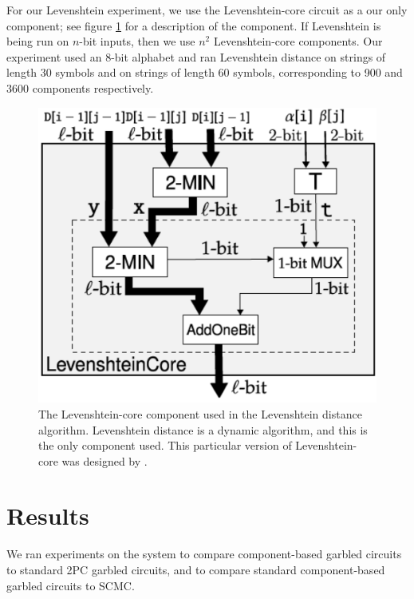For our Levenshtein experiment, we use the Levenshtein-core circuit as a our only component; see figure \ref{fig:leven-core} for a description of the component.
If Levenshtein is being run on $n$-bit inputs, then we use $n^2$ Levenshtein-core components. 
Our experiment used an 8-bit alphabet and ran Levenshtein distance on strings of length 30 symbols and on strings of length 60 symbols, corresponding to 900 and 3600 components respectively. 

\begin{figure}
    \center
    \includegraphics[scale=0.3]{images/leven_core}
    \caption{The Levenshtein-core component used in the Levenshtein distance algorithm. 
    Levenshtein distance is a dynamic algorithm, and this is the only component used. 
    This particular version of Levenshtein-core was designed by \cite{faster2pc}.}
    \label{fig:leven-core}
\end{figure}

\section{Results}


We ran experiments on the \CompGC system to compare component-based garbled circuits to standard 2PC garbled circuits, and to compare standard component-based garbled circuits to SCMC.

